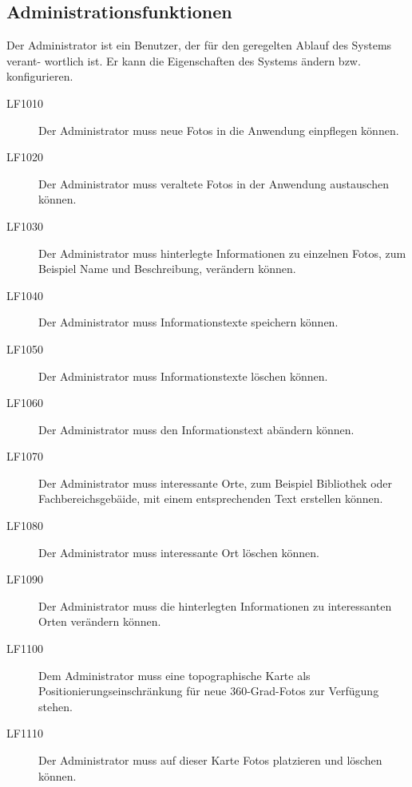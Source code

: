 \subsection{Administrationsfunktionen}
\label{sec:Administrationsfunktionen}

Der Administrator ist ein Benutzer, der für den geregelten Ablauf des Systems verant-
wortlich ist. Er kann die Eigenschaften des Systems ändern bzw. konfigurieren.

\begin{description}
  \item[LF1010] Der Administrator muss neue Fotos in die Anwendung einpflegen können.
  \item[LF1020] Der Administrator muss veraltete Fotos in der Anwendung austauschen können.
  \item[LF1030] Der Administrator muss hinterlegte Informationen zu einzelnen Fotos, zum Beispiel Name und Beschreibung, verändern können.
  \item[LF1040] Der Administrator muss Informationstexte speichern können.
  \item[LF1050] Der Administrator muss Informationstexte löschen können.
  \item[LF1060] Der Administrator muss den Informationstext abändern können.
  \item[LF1070] Der Administrator muss interessante Orte, zum Beispiel Bibliothek oder Fachbereichsgebäide, mit einem entsprechenden Text erstellen können.
  \item[LF1080] Der Administrator muss interessante Ort löschen können.
  \item[LF1090] Der Administrator muss die hinterlegten Informationen zu interessanten Orten verändern können.
  \item[LF1100] Dem Administrator muss eine topographische Karte als Positionierungseinschränkung für neue
  360-Grad-Fotos zur Verfügung stehen.
  \item[LF1110] Der Administrator muss auf dieser Karte Fotos platzieren und löschen können.
\end{description}